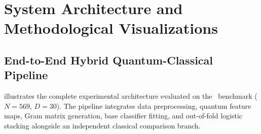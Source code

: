 \section{System Architecture and Methodological Visualizations}
\label{sec:system-diagrams}

\subsection{End-to-End Hybrid Quantum-Classical Pipeline}
 illustrates the complete experimental architecture evaluated on the \wdbc\ benchmark ($N=569$, $D=30$). The pipeline integrates data preprocessing, quantum feature maps, Gram matrix generation, base classifier fitting, and out-of-fold logistic stacking alongside an independent classical comparison branch.

